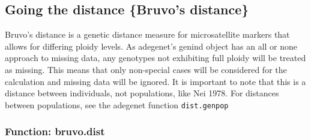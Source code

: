 \documentclass[letterpaper]{article}
\newcommand{\tab}{\hspace*{1em}}
\begin{document}
\subsection{Going the distance \{Bruvo's distance\}}

\tab\tab Bruvo's distance is a genetic distance measure for microsatellite markers that allows for differing ploidy levels. \cite{Bruvo:2004} As adegenet's genind object has an all or none approach to missing data, any genotypes not exhibiting full ploidy will be treated as missing. This means that only non-special cases will be considered for the calculation and missing data will be ignored. \cite{Bruvo:2004} It is important to note that this is a distance between individuals, not populations, like Nei 1978. For distances between populations, see the adegenet function \texttt{dist.genpop}\\
\subsubsection{Function: bruvo.dist}
\end{document}
